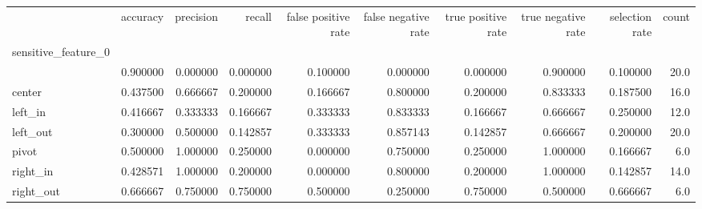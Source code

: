 \begin{tabular}{lrrrrrrrrr}
\toprule
{} &  accuracy &  precision &    recall &  false positive rate &  false negative rate &  true positive rate &  true negative rate &  selection rate &  count \\
sensitive\_feature\_0 &           &            &           &                      &                      &                     &                     &                 &        \\
\midrule
                    &  0.900000 &   0.000000 &  0.000000 &             0.100000 &             0.000000 &            0.000000 &            0.900000 &        0.100000 &   20.0 \\
center              &  0.437500 &   0.666667 &  0.200000 &             0.166667 &             0.800000 &            0.200000 &            0.833333 &        0.187500 &   16.0 \\
left\_in             &  0.416667 &   0.333333 &  0.166667 &             0.333333 &             0.833333 &            0.166667 &            0.666667 &        0.250000 &   12.0 \\
left\_out            &  0.300000 &   0.500000 &  0.142857 &             0.333333 &             0.857143 &            0.142857 &            0.666667 &        0.200000 &   20.0 \\
pivot               &  0.500000 &   1.000000 &  0.250000 &             0.000000 &             0.750000 &            0.250000 &            1.000000 &        0.166667 &    6.0 \\
right\_in            &  0.428571 &   1.000000 &  0.200000 &             0.000000 &             0.800000 &            0.200000 &            1.000000 &        0.142857 &   14.0 \\
right\_out           &  0.666667 &   0.750000 &  0.750000 &             0.500000 &             0.250000 &            0.750000 &            0.500000 &        0.666667 &    6.0 \\
\bottomrule
\end{tabular}
